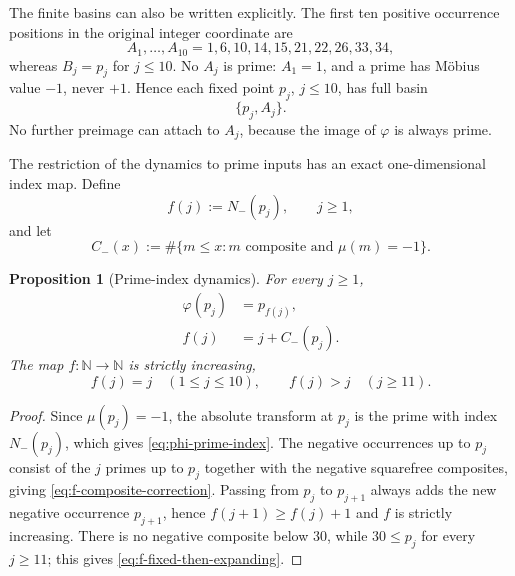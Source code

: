 \documentclass[11pt]{amsart}
\numberwithin{equation}{section}
\theoremstyle{plain}
\newtheorem{proposition}[theorem]{Proposition}
\theoremstyle{definition}
\theoremstyle{remark}
\begin{document}
The finite basins can also be written explicitly.  The first ten positive
occurrence positions in the original integer coordinate are
\begin{equation}
\label{eq:first-ten-A}
A_1,\ldots,A_{10}
=1,6,10,14,15,21,22,26,33,34,
\end{equation}
whereas $B_j=p_j$ for $j\le10$.  No $A_j$ is prime: $A_1=1$, and a prime has
M\"obius value $-1$, never $+1$.  Hence each fixed point $p_j$, $j\le10$, has
full basin
\begin{equation}
\label{eq:fixed-basin-two-points}
\boxed{\;\{p_j,A_j\}.\;}
\end{equation}
No further preimage can attach to $A_j$, because the image of $\varphi$ is
always prime.

The restriction of the dynamics to prime inputs has an exact one-dimensional
index map.  Define
\begin{equation}
\label{eq:f-index-map}
f(j):=N_-(p_j),
\qquad j\ge1,
\end{equation}
and let
\begin{equation}
\label{eq:Cminus-definition}
C_-(x):=\#\{m\le x:m\text{ composite and }\mu(m)=-1\}.
\end{equation}

\begin{proposition}[Prime-index dynamics]
\label{prop:prime-index-dynamics}
For every $j\ge1$,
\begin{align}
\varphi(p_j)&=p_{f(j)},
\label{eq:phi-prime-index}\\
f(j)&=j+C_-(p_j).
\label{eq:f-composite-correction}
\end{align}
The map $f:\mathbb N\to\mathbb N$ is strictly increasing,
\begin{equation}
\label{eq:f-fixed-then-expanding}
f(j)=j\quad(1\le j\le10),
\qquad
f(j)>j\quad(j\ge11).
\end{equation}
\end{proposition}

\begin{proof}
Since $\mu(p_j)=-1$, the absolute transform at $p_j$ is the prime with index
$N_-(p_j)$, which gives \eqref{eq:phi-prime-index}.  The negative occurrences
up to $p_j$ consist of the $j$ primes up to $p_j$ together with the negative
squarefree composites, giving \eqref{eq:f-composite-correction}.  Passing from
$p_j$ to $p_{j+1}$ always adds the new negative occurrence $p_{j+1}$, hence
$f(j+1)\ge f(j)+1$ and $f$ is strictly increasing.  There is no negative
composite below $30$, while $30\le p_j$ for every $j\ge11$; this gives
\eqref{eq:f-fixed-then-expanding}.
\end{proof}
\end{document}
